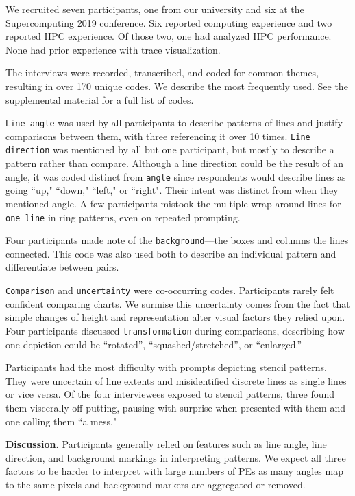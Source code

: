 We recruited seven participants, one from our university and six at the Supercomputing 2019 conference. Six reported computing experience and two reported HPC experience. Of those two, one had analyzed HPC performance. None had prior experience with trace visualization. 

The interviews were recorded, transcribed, and coded for common themes, resulting in over 170 unique codes. We describe the most frequently used. See the supplemental material for a full list of codes.

\texttt{Line angle} was used by all participants to describe patterns of lines and justify comparisons between them, with three referencing it over 10 times. \texttt{Line direction} was mentioned by all but one participant, but mostly to describe a pattern rather than compare. Although a line direction could be the result of an angle, it was coded distinct from \texttt{angle} since respondents would describe lines as going ``up," ``down," ``left," or ``right". Their intent was distinct from when they mentioned angle. A few participants mistook the multiple wrap-around lines for \texttt{one line} in ring patterns, even on repeated prompting.

Four participants made note of the \texttt{background}---the boxes and columns the lines connected. This code was also used both to describe an individual pattern and differentiate between pairs.

\texttt{Comparison} and \texttt{uncertainty} were co-occurring codes. Participants rarely felt confident comparing charts. We surmise this uncertainty comes from the fact that simple changes of height and representation alter visual factors they relied upon. Four participants discussed \texttt{transformation} during comparisons, describing how one depiction could be ``rotated'',  ``squashed/stretched'', or ``enlarged.''

Participants had the most difficulty with prompts depicting stencil patterns. They were uncertain of line extents and misidentified discrete lines as single lines or vice versa. Of the four interviewees exposed to stencil patterns, three found them viscerally off-putting, pausing with surprise when presented with them and one calling them ``a mess." 

\vspace{1ex}

\textbf{Discussion.} Participants generally relied on features such as line angle, line direction, and background markings in interpreting patterns. We expect all three factors to be harder to interpret with large numbers of PEs as many angles map to the same pixels and background markers are aggregated or removed.

